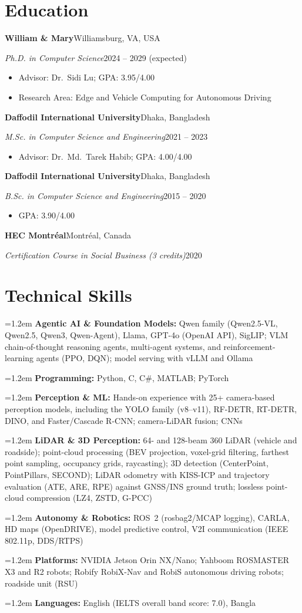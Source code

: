 \documentclass[11pt,letterpaper]{article}
\newcommand{\cventry}[4]{%
  \textbf{#1}\hfill #2\par\nobreak
  \textit{#3}\hfill #4\par}
\newcommand{\entrygap}{\par\vspace{5.5pt}}
\newcommand{\labeledrow}[2]{%
  \hangindent=1.2em\hangafter=1 \textbf{#1:} #2\par\vspace{2pt}}
\begin{document}
\section{Education}
\cventry{William \& Mary}{Williamsburg, VA, USA}
        {Ph.D. in Computer Science}{2024 -- 2029 (expected)}
\begin{itemize}
  \item Advisor: Dr.~Sidi Lu; GPA: 3.95/4.00
  \item Research Area: Edge and Vehicle Computing for Autonomous Driving
\end{itemize}
\entrygap
\cventry{Daffodil International University}{Dhaka, Bangladesh}
        {M.Sc. in Computer Science and Engineering}{2021 -- 2023}
\begin{itemize}
  \item Advisor: Dr.~Md.~Tarek Habib; GPA: 4.00/4.00
\end{itemize}
\entrygap
\cventry{Daffodil International University}{Dhaka, Bangladesh}
        {B.Sc. in Computer Science and Engineering}{2015 -- 2020}
\begin{itemize}
  \item GPA: 3.90/4.00
\end{itemize}
\entrygap
\cventry{HEC Montr\'eal}{Montr\'eal, Canada}
        {Certification Course in Social Business (3 credits)}{2020}

\section{Technical Skills}
\labeledrow{Agentic AI \& Foundation Models}{Qwen family (Qwen2.5-VL,
  Qwen2.5, Qwen3, Qwen-Agent), Llama, GPT-4o (OpenAI API), SigLIP;
  VLM chain-of-thought reasoning agents, multi-agent systems, and
  reinforcement-learning agents (PPO, DQN); model serving with vLLM and Ollama}
\labeledrow{Programming}{Python, C, C\#, MATLAB; PyTorch}
\labeledrow{Perception \& ML}{Hands-on experience with 25+ camera-based
  perception models, including the YOLO family (v8--v11), RF-DETR, RT-DETR,
  DINO, and Faster/Cascade R-CNN; camera-LiDAR fusion; CNNs}
\labeledrow{LiDAR \& 3D Perception}{64- and 128-beam 360\textdegree{} LiDAR
  (vehicle and roadside); point-cloud processing (BEV projection, voxel-grid
  filtering, farthest point sampling, occupancy grids, raycasting); 3D
  detection (CenterPoint, PointPillars, SECOND); LiDAR odometry with KISS-ICP
  and trajectory evaluation (ATE, ARE, RPE) against GNSS/INS ground truth;
  lossless point-cloud compression (LZ4, ZSTD, G-PCC)}
\labeledrow{Autonomy \& Robotics}{ROS~2 (rosbag2/MCAP logging), CARLA, HD maps
  (OpenDRIVE), model predictive control, V2I communication (IEEE 802.11p,
  DDS/RTPS)}
\labeledrow{Platforms}{NVIDIA Jetson Orin NX/Nano; Yahboom ROSMASTER X3 and R2
  robots; Robify RobiX-Nav and RobiS autonomous driving robots; roadside unit
  (RSU)}
\labeledrow{Languages}{English (IELTS overall band score: 7.0), Bangla}
\end{document}

